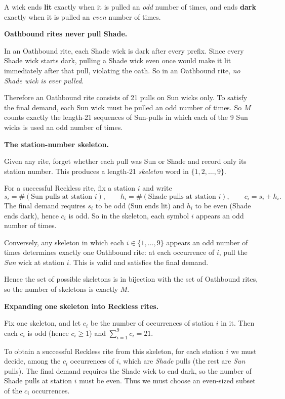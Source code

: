 
\SolutionPage

A wick ends \textbf{lit} exactly when it is pulled an \emph{odd} number of times, and ends \textbf{dark} exactly when it is pulled an \emph{even} number of times.

\medskip
\textbf{ Oathbound rites never pull Shade.}

In an Oathbound rite, each Shade wick is dark after every prefix.
Since every Shade wick starts dark, pulling a Shade wick even once would make it lit immediately after that pull, violating the oath.
So in an Oathbound rite, \emph{no Shade wick is ever pulled}.

Therefore an Oathbound rite consists of 21 pulls on Sun wicks only.
To satisfy the final demand, each Sun wick must be pulled an odd number of times.
So \(M\) counts exactly the length-21 sequences of Sun-pulls in which each of the 9 Sun wicks is used an odd number of times.

\medskip
\textbf{The station-number skeleton.}

Given any rite, forget whether each pull was Sun or Shade and record only its station number.
This produces a length-21 \emph{skeleton} word in \(\{1,2,\dots,9\}\).

For a successful Reckless rite, fix a station \(i\) and write
\[
s_i=\#(\text{Sun pulls at station }i),\qquad h_i=\#(\text{Shade pulls at station }i),\qquad c_i=s_i+h_i.
\]
The final demand requires \(s_i\) to be odd (Sun ends lit) and \(h_i\) to be even (Shade ends dark), hence \(c_i\) is odd.
So in the skeleton, each symbol \(i\) appears an odd number of times.

Conversely, any skeleton in which each \(i\in\{1,\dots,9\}\) appears an odd number of times determines exactly one Oathbound rite:
at each occurrence of \(i\), pull the \emph{Sun} wick at station \(i\).
This is valid and satisfies the final demand.

Hence the set of possible skeletons is in bijection with the set of Oathbound rites, so the number of skeletons is exactly \(M\).

\medskip
\textbf{Expanding one skeleton into Reckless rites.}

Fix one skeleton, and let \(c_i\) be the number of occurrences of station \(i\) in it.
Then each \(c_i\) is odd (hence \(c_i\ge 1\)) and \(\sum_{i=1}^9 c_i=21\).

To obtain a successful Reckless rite from this skeleton, for each station \(i\) we must decide, among the \(c_i\) occurrences of \(i\),
which are \emph{Shade} pulls (the rest are \emph{Sun} pulls).
The final demand requires the Shade wick to end dark, so the number of Shade pulls at station \(i\) must be even.
Thus we must choose an even-sized subset of the \(c_i\) occurrences.

